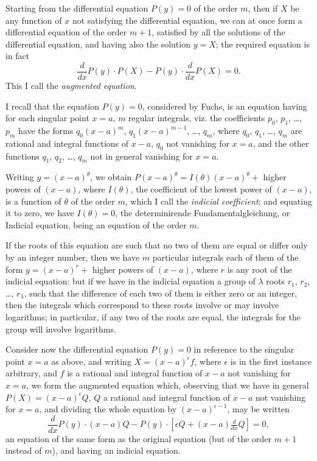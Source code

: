 \documentclass[11pt,a4paper]{article}
\theoremstyle{definition}
\begin{document}
Starting from the differential equation $P(y) = 0$ of the order $m$, then if $X$ be any function of $x$ not satisfying the differential equation, we can at once form a differential equation of the order $m + 1$, satisfied by all the solutions of the differential equation, and having also the solution $y = X$; the required equation is in fact
\[
\frac{d}{dx}P(y) \cdot P(X) - P(y) \cdot \frac{d}{dx}P(X) = 0.
\]
This I call the \textit{augmented equation}.

I recall that the equation $P(y) = 0$, considered by Fuchs, is an equation having for each singular point $x = a$, $m$ regular integrals, viz. the coefficients $p_0$, $p_1$, \ldots, $p_m$ have the forms $q_0(x - a)^m$, $q_1(x - a)^{m-1}$, \ldots, $q_m$, where $q_0$, $q_1$, \ldots, $q_m$ are rational and integral functions of $x - a$, $q_0$ not vanishing for $x = a$, and the other functions $q_1$, $q_2$, \ldots, $q_m$ not in general vanishing for $x = a$.

Writing $y = (x - a)^\theta$, we obtain $P(x - a)^\theta = I(\theta)(x - a)^\theta +$ higher powers of $(x - a)$, where $I(\theta)$, the coefficient of the lowest power of $(x - a)$, is a function of $\theta$ of the order $m$, which I call the \textit{indicial coefficient}; and equating it to zero, we have $I(\theta) = 0$, the determinirende Fundamentalgleichung, or Indicial equation, being an equation of the order $m$.

If the roots of this equation are such that no two of them are equal or differ only by an integer number, then we have $m$ particular integrals each of them of the form $y = (x - a)^r +$ higher powers of $(x - a)$, where $r$ is any root of the indicial equation: but if we have in the indicial equation a group of $\lambda$ roots $r_1$, $r_2$, \ldots, $r_\lambda$, such that the difference of each two of them is either zero or an integer, then the integrals which correspond to these roots involve or may involve logarithms; in particular, if any two of the roots are equal, the integrals for the group will involve logarithms.

Consider now the differential equation $P(y) = 0$ in reference to the singular point $x = a$ as above, and writing $X = (x - a)^\epsilon f$, where $\epsilon$ is in the first instance arbitrary, and $f$ is a rational and integral function of $x - a$ not vanishing for $x = a$, we form the augmented equation which, observing that we have in general $P(X) = (x - a)^\epsilon Q$, $Q$ a rational and integral function of $x - a$ not vanishing for $x = a$, and dividing the whole equation by $(x - a)^{\epsilon - 1}$, may be written
\[
\frac{d}{dx}P(y) \cdot (x - a)Q - P(y) \cdot [\epsilon Q + (x - a)\tfrac{d}{dx}Q] = 0,
\]
an equation of the same form as the original equation (but of the order $m + 1$ instead of $m$), and having an indicial equation.
\end{document}
